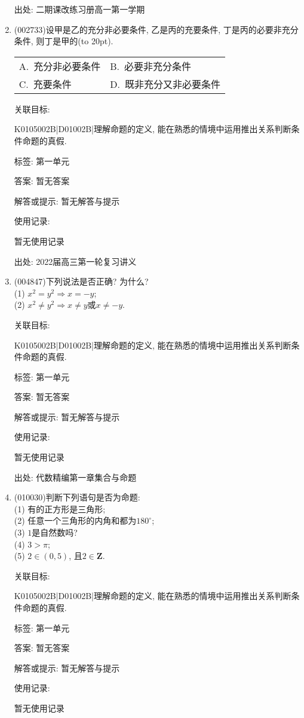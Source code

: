 \documentclass[10pt,a4paper]{article}
\newcommand{\bracket}[1]{(\hbox to #1pt{})}
\newcommand{\twoch}[4]{\par\begin{tabular}{p{.46\textwidth}p{.46\textwidth}}
A.~#1& B.~#2\\
C.~#3& D.~#4
\end{tabular}}
\begin{document}
\begin{enumerate}[1.]
出处: 二期课改练习册高一第一学期
\item { (002733)}设甲是乙的充分非必要条件, 乙是丙的充要条件, 丁是丙的必要非充分条件, 则丁是甲的\bracket{20}.
\twoch{充分非必要条件}{必要非充分条件}{充要条件}{既非充分又非必要条件}


关联目标:

K0105002B|D01002B|理解命题的定义, 能在熟悉的情境中运用推出关系判断条件命题的真假.



标签: 第一单元

答案: 暂无答案

解答或提示: 暂无解答与提示

使用记录:

暂无使用记录


出处: 2022届高三第一轮复习讲义
\item { (004847)}下列说法是否正确? 为什么?\\
(1) $x^2=y^2\Rightarrow x=-y$;\\
(2) $x^2\ne y^2\Rightarrow x\ne y$或$x\ne -y$.


关联目标:

K0105002B|D01002B|理解命题的定义, 能在熟悉的情境中运用推出关系判断条件命题的真假.



标签: 第一单元

答案: 暂无答案

解答或提示: 暂无解答与提示

使用记录:

暂无使用记录


出处: 代数精编第一章集合与命题
\item { (010030)}判断下列语句是否为命题:\\
(1) 有的正方形是三角形;\\
(2) 任意一个三角形的内角和都为$180^\circ$;\\
(3) $1$是自然数吗?\\
(4) $3>\pi$;\\
(5) $2\in (0, 5)$, 且$2\in \mathbf{Z}$.


关联目标:

K0105002B|D01002B|理解命题的定义, 能在熟悉的情境中运用推出关系判断条件命题的真假.



标签: 第一单元

答案: 暂无答案

解答或提示: 暂无解答与提示

使用记录:

暂无使用记录



\end{enumerate}
\end{document}
